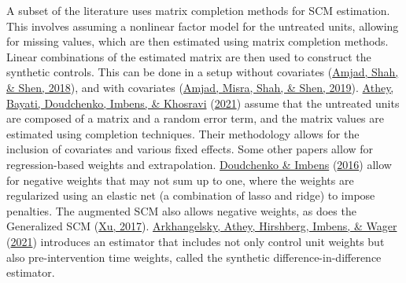\documentclass[12pt,nobind, a4paper]{reedthesis}
\begin{document}
 A subset of the literature uses matrix completion methods for SCM estimation. This involves assuming a nonlinear factor model for the untreated units, allowing for missing values, which are then estimated using matrix completion methods. Linear combinations of the estimated matrix are then used to construct the synthetic controls. This can be done in a setup without covariates (\protect\hyperlink{ref-amjad_robust_2018}{Amjad, Shah, \& Shen, 2018}), and with covariates (\protect\hyperlink{ref-amjad_mrsc_2019}{Amjad, Misra, Shah, \& Shen, 2019}). \protect\hyperlink{ref-athey_matrix_2021}{Athey, Bayati, Doudchenko, Imbens, \& Khosravi} (\protect\hyperlink{ref-athey_matrix_2021}{2021}) assume that the untreated units are composed of a matrix and a random error term, and the matrix values are estimated using completion techniques. Their methodology allows for the inclusion of covariates and various fixed effects. Some other papers allow for regression-based weights and extrapolation. \protect\hyperlink{ref-doudchenko_balancing_2016}{Doudchenko \& Imbens} (\protect\hyperlink{ref-doudchenko_balancing_2016}{2016}) allow for negative weights that may not sum up to one, where the weights are regularized using an elastic net (a combination of lasso and ridge) to impose penalties. The augmented SCM also allows negative weights, as does the Generalized SCM (\protect\hyperlink{ref-xu_generalized_2017}{Xu, 2017}). \protect\hyperlink{ref-arkhangelsky_synthetic_2021}{Arkhangelsky, Athey, Hirshberg, Imbens, \& Wager} (\protect\hyperlink{ref-arkhangelsky_synthetic_2021}{2021}) introduces an estimator that includes not only control unit weights but also pre-intervention time weights, called the synthetic difference-in-difference estimator.
 \linebreak
\end{document}
